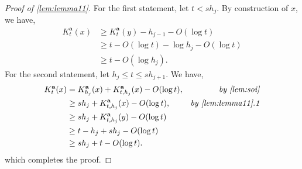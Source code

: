 \documentclass[a4paper,UKenglish,cleveref,autoref,thm-restate]{lipics-v2021}
\begin{document}
\begin{proof}[Proof of \cref{lem:lemma11}]
	For the first statement, let $t<sh_j$. By construction of $x$, we have, 
	\begin{align*}
		K_t^\mathbf{a}(x)&\geq K_t^\mathbf{a}(y)-h_{j-1}-O(\log t)\\
		&\geq t-O(\log t)-\log h_j-O(\log t)\\
		&\geq t-O(\log h_j).
	\end{align*}
	For the second statement, let $h_j\leq t\leq sh_{j+1}$. We have, 
	\begin{align*}
		K_t^\mathbf{a}(x)&=K_{h_j}^\mathbf{a}(x)+K_{t,h_j}^\mathbf{a}(x)-O(\log t),&\textit{ by \cref{lem:soi}}\\
		&\geq sh_j+K_{t,h_j}^\mathbf{a}(x)-O(\log t),&\textit{by \cref{lem:lemma11}.1}\\
		&\geq sh_j+K_{t,h_j}^\mathbf{a}(y)-O(\log t)\\
		&\geq t-h_j+sh_j-O(\log t)\\%
		&\geq sh_j+t-O(\log t). 
	\end{align*}
	which completes the proof. 
\end{proof}
\end{document}
